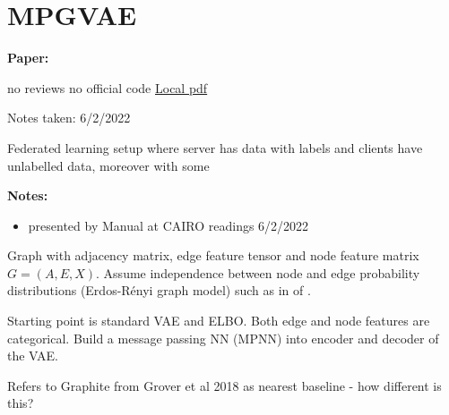 \clearpage

\section{MPGVAE}\label{sec:MPGVAE}

\begin{notebox}
\textbf{Paper: } 
\vspace{5pt}

no reviews
\hspace{1cm}
no official code
\hspace{1cm}
\href{Flam-Shepherd et al_2021_MPGVAE.pdf}{Local pdf}

\hfill Notes taken: 6/2/2022 
\end{notebox}

\begin{notebox}[colback=red!5]
\tldr Federated learning setup where server has data with labels and clients have unlabelled data, moreover with some 
\end{notebox}

\begin{notebox}[colback=yellow!5]
\textbf{Notes:} 
\begin{itemize}[nosep]
\item presented by Manual at CAIRO readings 6/2/2022
\end{itemize}
\end{notebox}


Graph with adjacency matrix, edge feature tensor and node feature matrix $G = (A, E, X)$.
Assume independence between node and edge probability distributions (Erdos-R\'enyi graph model) such as in  of \textcite{simonovsky_graphvae_2018}.

Starting point is standard VAE and ELBO. Both edge and node features are categorical.
Build a message passing NN (MPNN) into encoder and decoder of the VAE.

Refers to Graphite from Grover et al 2018 as nearest baseline - how different is this?

